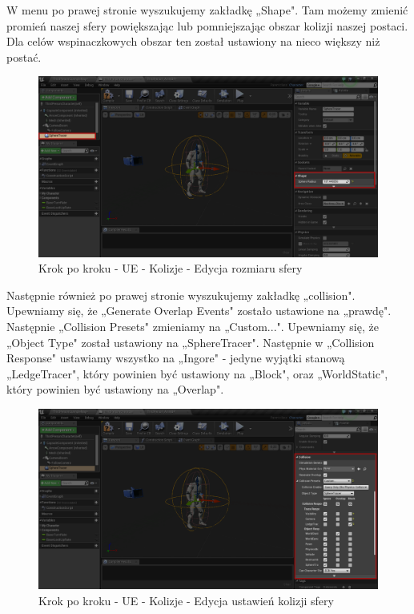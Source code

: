 \documentclass[12pt]{xmgr}
\begin{document}
W menu po prawej stronie wyszukujemy zakładkę „Shape". Tam możemy zmienić promień naszej sfery powiększając lub pomniejszając obszar kolizji naszej postaci. Dla celów wspinaczkowych obszar ten został ustawiony na nieco większy niż postać.

\begin{figure}[!htb]
    \begin{center}
    \includegraphics[scale=0.35]{Screeny/UeKrokPoKroku/UE-Climb-Sphere02.png}
    \end{center}
    \caption{Krok po kroku - UE - Kolizje - Edycja rozmiaru sfery}
\end{figure}
\newpage

Następnie również po prawej stronie wyszukujemy zakładkę „collision". Upewniamy się, że „Generate Overlap Events" zostało ustawione na „prawdę". Następnie „Collision Presets" zmieniamy na „Custom...". Upewniamy się, że „Object Type" został ustawiony na „SphereTracer". Następnie w „Collision Response" ustawiamy wszystko na „Ingore" - jedyne wyjątki stanową „LedgeTracer", który powinien być ustawiony na „Block", oraz „WorldStatic", który powinien być ustawiony na „Overlap".

\begin{figure}[!htb]
    \begin{center}
    \includegraphics[scale=0.35]{Screeny/UeKrokPoKroku/UE-Climb-Sphere03.png}
    \end{center}
    \caption{Krok po kroku - UE - Kolizje - Edycja ustawień kolizji sfery}
\end{figure}
\newpage
\end{document}
